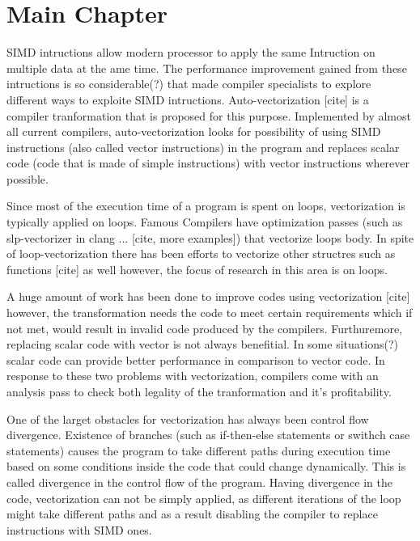 \documentclass[\main/thesis.tex]{subfiles}
\begin{document}
\chapter{Main Chapter}

SIMD intructions allow modern processor to apply the same Intruction on multiple data at the ame time. The performance improvement gained from these intructions is 
so considerable(?) that made compiler specialists to explore different ways to exploite SIMD intructions. Auto-vectorization [cite] is a compiler tranformation that is proposed
for this purpose. Implemented by almost all current compilers, auto-vectorization looks for possibility of using SIMD instructions (also called vector instructions) in the program and replaces
scalar code (code that is made of simple instructions) with vector instructions wherever possible.

Since most of the execution time of a program is spent on loops, vectorization is typically applied on loops. Famous Compilers have optimization passes (such as slp-vectorizer in clang ... [cite, more examples])
that vectorize loops body. In spite of loop-vectorization there has been efforts to vectorize other structres such as functions [cite] as well however, the focus of research in this area is on loops.

A huge amount of work has been done to improve codes using vectorization [cite] however, the transformation needs the code to meet certain requirements which if not met, would result in invalid code
produced by the compilers. Furthuremore, replacing scalar code with vector is not always benefitial. In some situations(?) scalar code can provide better performance in comparison to vector code.
In response to these two problems with vectorization, compilers come with an analysis pass to check both legality of the tranformation and it's profitability.

One of the larget obstacles for vectorization has always been control flow divergence. Existence of branches (such as if-then-else statements or swithch case statements) causes the program to take different paths during execution time 
based on some conditions inside the code that could change dynamically. This is called divergence in the control flow of the program. Having divergence in the code, vectorization can not be simply applied,
as different iterations of the loop might take different paths and as a result disabling the compiler to replace instructions with SIMD ones. 
\end{document}
